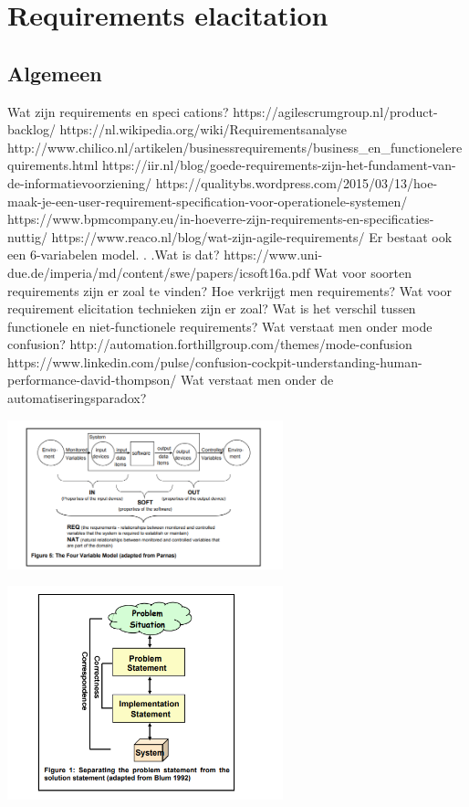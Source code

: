 \documentclass{article}
\begin{document}
 
	
	\section{Requirements elacitation}
	
	\subsection{Algemeen}
	
	Wat zijn requirements en specications?
	https://agilescrumgroup.nl/product-backlog/
	https://nl.wikipedia.org/wiki/Requirementsanalyse
	http://www.chilico.nl/artikelen/businessrequirements/business_en_functionelerequirements.html
	https://iir.nl/blog/goede-requirements-zijn-het-fundament-van-de-informatievoorziening/
	https://qualitybs.wordpress.com/2015/03/13/hoe-maak-je-een-user-requirement-specification-voor-operationele-systemen/
	https://www.bpmcompany.eu/in-hoeverre-zijn-requirements-en-specificaties-nuttig/
	https://www.reaco.nl/blog/wat-zijn-agile-requirements/
	Er bestaat ook een 6-variabelen model. . .Wat is dat?
	https://www.uni-due.de/imperia/md/content/swe/papers/icsoft16a.pdf
	Wat voor soorten requirements zijn er zoal te vinden?
	Hoe verkrijgt men requirements?
	Wat voor requirement elicitation technieken zijn er zoal?
	Wat is het verschil tussen functionele en niet-functionele
	requirements?
	Wat verstaat men onder mode confusion?
	http://automation.forthillgroup.com/themes/mode-confusion
	https://www.linkedin.com/pulse/confusion-cockpit-understanding-human-performance-david-thompson/
	Wat verstaat men onder de automatiseringsparadox?
	
		\includegraphics[width=8cm]{4varparnas.png}
		
				\includegraphics[width=8cm]{requirement.png}
		
\end{document}
